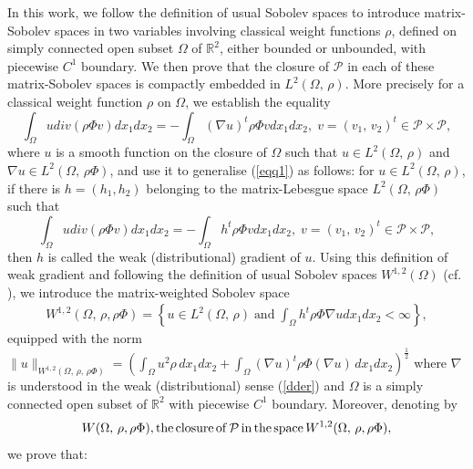 \documentclass[11pt]{article}
\begin{document}
	
	{In this work, we follow the definition of usual Sobolev spaces \cite[1.62, 3.2(b)]{RA1} to  introduce matrix-Sobolev spaces in two variables involving  classical weight functions $\rho$, defined on simply connected open subset $\Omega$ of $\mathbb{R}^2$, either bounded or unbounded, with piecewise $C^1$ boundary. We then prove that the closure of $\mathcal{P}$ in each of these matrix-Sobolev spaces is compactly embedded in $L^2(\Omega,\,\rho)$.
		More precisely for a classical weight function $\rho$ on $\Omega$, we establish the equality 
		\begin{equation*}
			\int_{\Omega}udiv(\rho\Phi v)dx_1dx_2=-\int_{\Omega}(\nabla u)^t\rho\Phi vdx_1dx_2,\;v=(v_1,\,v_2)^t\in \mathcal{P}\times \mathcal{P},
		\end{equation*}
		where  $u$ is a smooth function on the closure of $\Omega$ such that $u\in L^2(\Omega,\,\rho)$ and $\nabla u\in L^2(\Omega,\, \rho\Phi)$, and use it to generalise  (\ref{eqq1})  {as follows:}} for $u\in L^2(\Omega,\, \rho)$, if there is $h=(h_1,h_2)$ belonging to the matrix-Lebesgue space $L^2(\Omega,\, \rho\Phi)$ such that 
	\begin{equation}\label{dder}
		\int_{\Omega}udiv(\rho\Phi v)dx_1dx_2=-\int_{\Omega}h^t\rho\Phi vdx_1dx_2,\;v=(v_1,\,v_2)^t\in \mathcal{P}\times \mathcal{P},
	\end{equation}
	then $h$ is called the weak (distributional) gradient of $u$. Using this definition of weak gradient and following the definition of usual Sobolev spaces $W^{1,2}(\Omega)$ (cf. \cite[Definition 3.2]{RA1}), we introduce the matrix-weighted Sobolev space
	\begin{align*}
		W^{1,2}(\Omega,\,  \rho, \rho \Phi)= \left\{ u \in L^2(\Omega,\,  \rho) \; \text{and} \; \int_{\Omega}h^t\rho\Phi\nabla udx_1dx_2<\infty\right\},
	\end{align*}
	{equipped with the norm $\lVert u \rVert_{W^{1,2}(\Omega,\, \rho,\,\rho\Phi)} =\left( \int_\Omega u^2 \rho \,dx_1dx_2 + \int_\Omega (\nabla u)^t \rho \Phi (\nabla u) \,dx_1dx_2 \right)^{\frac{1}{2}}$ 
	where $\nabla$ is understood in the weak (distributional) sense (\ref{dder}) and $\Omega$ {is a} simply connected open subset of $\mathbb{R}^2$ with piecewise $C^1$ boundary. Moreover, denoting by 
	\begin{equation*}
	W(\Omega,\,\rho,\rho\Phi), {\rm the\, closure\, of}\, \mathcal{P} \,{\rm in \,the \,space} \,W^{1,2}(\Omega,\,  \rho, \rho \Phi)
		,\end{equation*}} we prove that:
\end{document}
